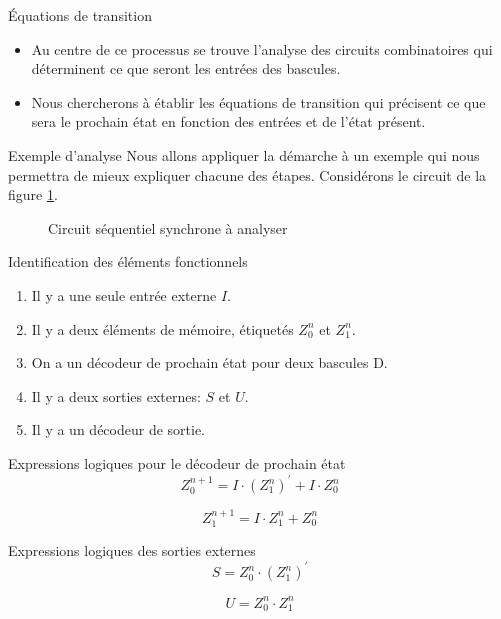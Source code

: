 \documentclass[presentation]{beamer}
\begin{document}
\begin{frame}[label={sec:org8626f43}]{Équations de transition}
\begin{itemize}
\item Au centre de ce processus se trouve l'analyse des circuits combinatoires qui déterminent ce que seront les entrées des bascules.

\item Nous chercherons à établir les \alert{équations de transition} qui précisent ce que sera le prochain état en fonction des entrées et de l'état présent.
\end{itemize}
\end{frame}

\begin{frame}[label={sec:org7a6e0fc}]{Exemple d'analyse}
Nous allons appliquer la démarche à un exemple qui nous permettra de
mieux expliquer chacune des étapes. Considérons le circuit de la
figure \ref{fig:orgb45f17a}.

\begin{figure}[htbp]
\centering

\caption{\label{fig:orgb45f17a}Circuit séquentiel synchrone à analyser}
\end{figure}
\end{frame}


\begin{frame}[label={sec:orgdf61e8e}]{Identification des éléments fonctionnels}
\begin{enumerate}
\item Il y a une seule entrée externe \(I\).
\item Il y a deux éléments de mémoire, étiquetés \(Z_0^n\) et  \(Z_1^n\).
\item On a un décodeur de prochain état pour deux bascules D.
\item Il y a deux sorties externes: \(S\) et \(U\).
\item Il y a un décodeur de sortie.
\end{enumerate}
\end{frame}

\begin{frame}[label={sec:org82637d0}]{Expressions logiques pour le décodeur de prochain état}
$$ Z_0^{n+1} = I \cdot (Z_1^n)^\prime  + I \cdot Z_0^n $$

$$ Z_1^{n+1} = I \cdot Z_1^n +  Z_0^n  $$
\end{frame}

\begin{frame}[label={sec:org51c5f8c}]{Expressions logiques des sorties externes}
$$ S =  Z_0^n \cdot (Z_1^{n})^\prime $$

$$ U =  Z_0^n \cdot Z_1^{n} $$
\end{frame}
\end{document}
